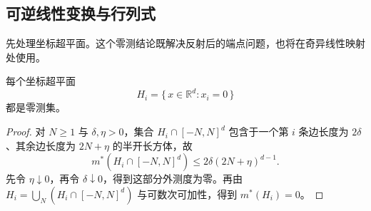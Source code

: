 \subsection{可逆线性变换与行列式}
\label{b1:subsec:030402}

先处理坐标超平面。这个零测结论既解决反射后的端点问题，也将在奇异线性映射处使用。

\begin{lemma}
\label{b1:lem:coordinate-hyperplane-null}
每个坐标超平面
\[
H_i=\{\,x\in\mathbb R^d:x_i=0\,\}
\]
都是零测集。
\end{lemma}
\begin{proof}
对 \(N\geq1\) 与 \(\delta,\eta>0\)，集合 \(H_i\cap[-N,N]^d\) 包含于一个第 \(i\) 条边长度为 \(2\delta\)、其余边长度为 \(2N+\eta\) 的半开长方体，故
\[
m^*(H_i\cap[-N,N]^d)
\leq 2\delta(2N+\eta)^{d-1}.
\]
先令 \(\eta\downarrow0\)，再令 \(\delta\downarrow0\)，得到这部分外测度为零。再由
\(H_i=\bigcup_N(H_i\cap[-N,N]^d)\) 与可数次可加性，得到 \(m^*(H_i)=0\)。
\end{proof}

